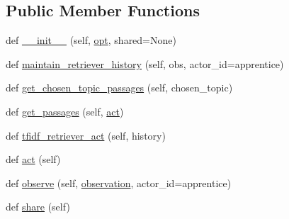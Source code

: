 \subsection*{Public Member Functions}
\begin{DoxyCompactItemize}
\item 
def \hyperlink{classprojects_1_1wizard__of__wikipedia_1_1knowledge__retriever_1_1knowledge__retriever_1_1KnowledgeRetrieverAgent_a56e833bf9622d078a5b8b808091e9060}{\+\_\+\+\_\+init\+\_\+\+\_\+} (self, \hyperlink{classprojects_1_1wizard__of__wikipedia_1_1knowledge__retriever_1_1knowledge__retriever_1_1KnowledgeRetrieverAgent_a6869be2c3be40d0ccac44b6b19357f26}{opt}, shared=None)
\item 
def \hyperlink{classprojects_1_1wizard__of__wikipedia_1_1knowledge__retriever_1_1knowledge__retriever_1_1KnowledgeRetrieverAgent_a2801dcbb7f6d0c021b4e8778498abcb7}{maintain\+\_\+retriever\+\_\+history} (self, obs, actor\+\_\+id=\textquotesingle{}apprentice\textquotesingle{})
\item 
def \hyperlink{classprojects_1_1wizard__of__wikipedia_1_1knowledge__retriever_1_1knowledge__retriever_1_1KnowledgeRetrieverAgent_ad7ec946d49376942cfa3a8eff0721014}{get\+\_\+chosen\+\_\+topic\+\_\+passages} (self, chosen\+\_\+topic)
\item 
def \hyperlink{classprojects_1_1wizard__of__wikipedia_1_1knowledge__retriever_1_1knowledge__retriever_1_1KnowledgeRetrieverAgent_a6eded0e2af98d064dcf803b7d239101f}{get\+\_\+passages} (self, \hyperlink{classprojects_1_1wizard__of__wikipedia_1_1knowledge__retriever_1_1knowledge__retriever_1_1KnowledgeRetrieverAgent_a0a560f254aaecee85d01266ecf5d45b6}{act})
\item 
def \hyperlink{classprojects_1_1wizard__of__wikipedia_1_1knowledge__retriever_1_1knowledge__retriever_1_1KnowledgeRetrieverAgent_a389261b03820abae81c05211056db463}{tfidf\+\_\+retriever\+\_\+act} (self, history)
\item 
def \hyperlink{classprojects_1_1wizard__of__wikipedia_1_1knowledge__retriever_1_1knowledge__retriever_1_1KnowledgeRetrieverAgent_a0a560f254aaecee85d01266ecf5d45b6}{act} (self)
\item 
def \hyperlink{classprojects_1_1wizard__of__wikipedia_1_1knowledge__retriever_1_1knowledge__retriever_1_1KnowledgeRetrieverAgent_a5116c18367cb3b8067ae2db42cce9773}{observe} (self, \hyperlink{classprojects_1_1wizard__of__wikipedia_1_1knowledge__retriever_1_1knowledge__retriever_1_1KnowledgeRetrieverAgent_a5f5a97ffa5bbb97a1a15377a56fd4bdc}{observation}, actor\+\_\+id=\textquotesingle{}apprentice\textquotesingle{})
\item 
def \hyperlink{classprojects_1_1wizard__of__wikipedia_1_1knowledge__retriever_1_1knowledge__retriever_1_1KnowledgeRetrieverAgent_a1befed09274e61e1872da0a0d8bf9804}{share} (self)
\end{DoxyCompactItemize}
